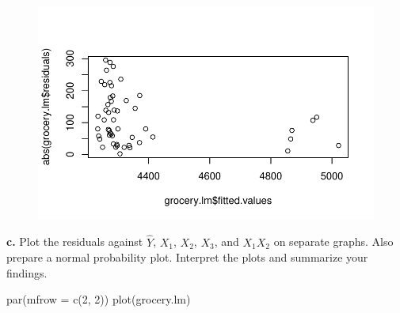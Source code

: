 \documentclass[
  letterpaper,
  DIV=11,
  numbers=noendperiod]{scrartcl}
\newenvironment{Shaded}{\begin{snugshade}}{\end{snugshade}}
\newcommand{\AttributeTok}[1]{\textcolor[rgb]{0.40,0.45,0.13}{#1}}
\newcommand{\DecValTok}[1]{\textcolor[rgb]{0.68,0.00,0.00}{#1}}
\newcommand{\FunctionTok}[1]{\textcolor[rgb]{0.28,0.35,0.67}{#1}}
\newcommand{\NormalTok}[1]{\textcolor[rgb]{0.00,0.23,0.31}{#1}}
\newcommand{\SpecialCharTok}[1]{\textcolor[rgb]{0.37,0.37,0.37}{#1}}
\begin{document}
\begin{Shaded}
\end{Shaded}

\begin{figure}[H]

{\centering \includegraphics{sta9700_herlan_ch6_2023_04_12_files/figure-pdf/unnamed-chunk-10-1.pdf}

}

\end{figure}

\textbf{c.} Plot the residuals against \(\hat Y\), \(X_{1}\), \(X_{2}\),
\(X_{3}\), and \(X_{1}X_{2}\) on separate graphs. Also prepare a normal
probability plot. Interpret the plots and summarize your findings.

\begin{Shaded}
\begin{Highlighting}[]
\FunctionTok{par}\NormalTok{(}\AttributeTok{mfrow =} \FunctionTok{c}\NormalTok{(}\DecValTok{2}\NormalTok{, }\DecValTok{2}\NormalTok{))}
\FunctionTok{plot}\NormalTok{(grocery.lm)}
\end{Highlighting}
\end{Shaded}
\end{document}
